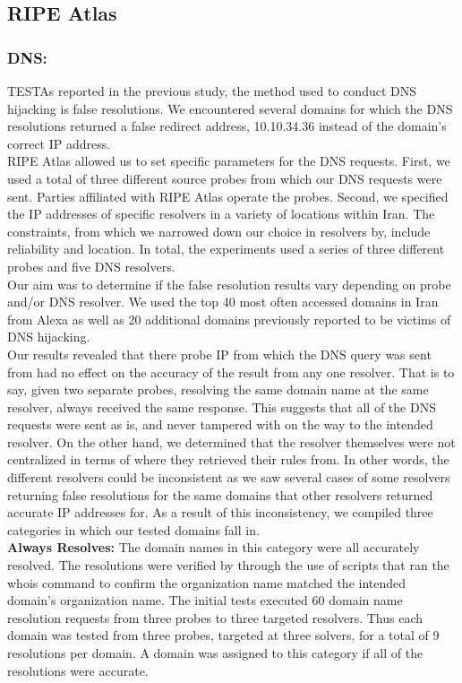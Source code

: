 \subsection{RIPE Atlas }

\subsubsection{DNS:}TESTAs reported in the previous study, the method used to conduct DNS hijacking is false resolutions. We encountered several domains for which the DNS resolutions returned a false redirect address, 10.10.34.36 instead of the domain’s correct IP address. \\
RIPE Atlas allowed us to set specific parameters for the DNS requests. First, we used a total of three different source probes from which our DNS requests were sent. Parties affiliated with RIPE Atlas operate the probes. Second, we specified the IP addresses of specific resolvers in a variety of locations within Iran. The constraints, from which we narrowed down our choice in resolvers by, include reliability and location. In total, the experiments used a series of three different probes and five DNS resolvers. \\
Our aim was to determine if the false resolution results vary depending on probe and/or DNS resolver. We used the top 40 most often accessed domains in Iran from Alexa as well as 20 additional domains previously reported to be victims of DNS hijacking.\\
	Our results revealed that there probe IP from which the DNS query was sent from had no effect on the accuracy of the result from any one resolver. That is to say, given two separate probes, resolving the same domain name at the same resolver, always received the same response. This suggests that all of the DNS requests were sent as is, and never tampered with on the way to the intended resolver. On the other hand, we determined that the resolver themselves were not centralized in terms of where they retrieved their rules from. In other words, the different resolvers could be inconsistent as we saw several cases of some resolvers returning false resolutions for the same domains that other resolvers returned accurate IP addresses for. As a result of this inconsistency, we compiled three categories in which our tested domains fall in.\\

\textbf{Always Resolves:} The domain names in this category were all accurately resolved. The resolutions were verified by through the use of scripts that ran the whois command to confirm the organization name matched the intended domain’s organization name. The initial tests executed 60 domain name resolution requests from three probes to three targeted resolvers. Thus each domain was tested from three probes, targeted at three solvers, for a total of 9 resolutions per domain. A domain was assigned to this category if all of the resolutions were accurate.

